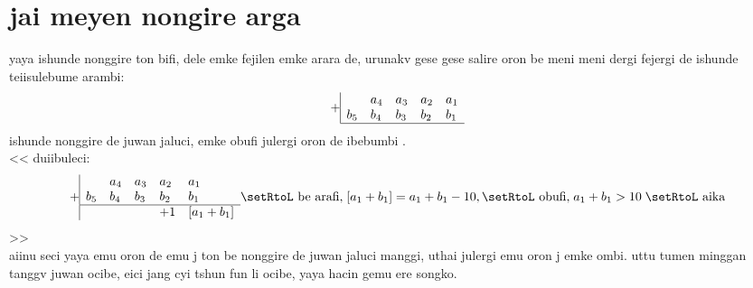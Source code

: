 \documentclass{report}
\begin{document}
\chapter{jai meyen nongire arga}
yaya ishunde nonggire ton bifi, dele emke fejilen emke arara de, urunakv gese gese salire oron be meni meni dergi fejergi de ishunde teiisulebume arambi:
\[
    +\begin{array}{|lllll}
      &  a_4 & a_3 & a_2 & a_1\\
        b_5 & b_4 & b_3 &b_2 &b_1\\\hline
    \end{array}
\]
ishunde nonggire de juwan jaluci, emke obufi julergi oron de ibebumbi .\\
<< duiibuleci:
\begin{equation}
    +\begin{array}{|lllll}
      &  a_4 & a_3 & a_2 & a_1\\
        b_5 & b_4 & b_3 &b_2 &b_1\\\hline
        &&& +1& [a_1+b_1]
    \end{array}
    \text{\setRtoL be arafi,}\; [a_1+b_1]=a_1+b_1-10, \text{\setRtoL obufi,}\; a_1+b_1 > 10\; \text{\setRtoL aika}
\end{equation}
>>\\
aiinu seci yaya emu oron de emu j ton be nonggire de juwan jaluci manggi, uthai julergi emu oron j emke ombi. uttu tumen minggan tanggv juwan ocibe, eici jang cyi tshun fun li ocibe, yaya hacin gemu ere songko.\\
\end{document}
